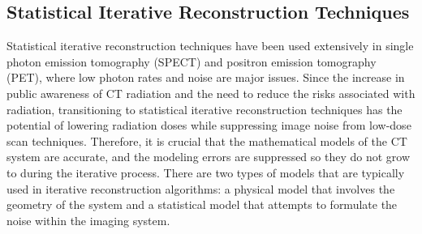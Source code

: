 \subsection{Statistical Iterative Reconstruction Techniques}
Statistical iterative reconstruction techniques have been used extensively in single photon emission tomography (SPECT) and positron emission tomography (PET), where low photon rates and noise are major issues.  Since the increase in public awareness of CT radiation and the need to reduce the risks associated with radiation, transitioning to statistical iterative reconstruction techniques has the potential of lowering radiation doses while suppressing image noise from low-dose scan techniques.  Therefore, it is crucial that the mathematical models of the CT system are accurate, and the modeling errors are suppressed so they do not grow to during the iterative process.  There are two types of models that are typically used in iterative reconstruction algorithms: a physical model that involves the geometry of the system and a statistical model that attempts to formulate the noise within the imaging system.



